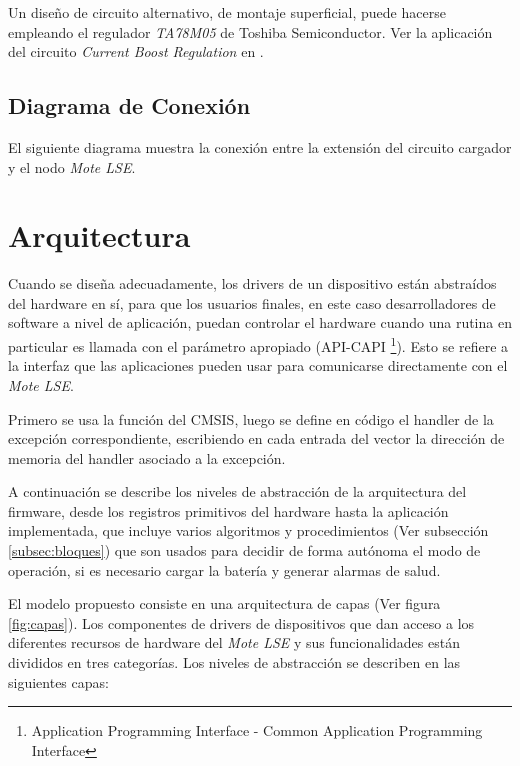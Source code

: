 {Un diseño de circuito alternativo, de montaje superficial, puede hacerse empleando el regulador \textit{TA78M05} de Toshiba Semiconductor. Ver la aplicación del circuito \textit{Current Boost Regulation} en \citep{78M05}.


\subsection{Diagrama de Conexión}
\label{subsec:conexión}
El siguiente diagrama muestra la conexión entre la extensión del circuito cargador y el nodo \textit{Mote LSE}.

\section{Arquitectura}
\label{sec:arq}
Cuando se diseña adecuadamente, los drivers de un dispositivo están abstraídos del hardware en sí, para que los usuarios finales, en este caso desarrolladores de software a nivel de aplicación, puedan controlar el hardware cuando una rutina en particular es llamada con el parámetro apropiado (API-CAPI \footnote{Application Programming Interface - Common Application Programming Interface}). Esto se refiere a la interfaz que las aplicaciones pueden usar para comunicarse directamente con el \textit{Mote LSE}.

Primero se usa la función del CMSIS, luego se define en código el handler de la excepción correspondiente, escribiendo en cada entrada del vector la dirección de memoria del handler asociado a la excepción.

A continuación se describe los niveles de abstracción de la arquitectura del firmware, desde los registros primitivos del hardware hasta la aplicación implementada, que incluye varios algoritmos y procedimientos (Ver subsección \ref{subsec:bloques}) que son usados para decidir de forma autónoma el modo de operación, si es necesario cargar la batería y generar alarmas de salud.

El modelo propuesto consiste en una arquitectura de capas (Ver figura \ref{fig:capas}). Los componentes de drivers de dispositivos que dan acceso a los diferentes recursos de hardware del \textit{Mote LSE} y sus funcionalidades están divididos en tres categorías. Los niveles de abstracción se describen en las siguientes capas:

}
